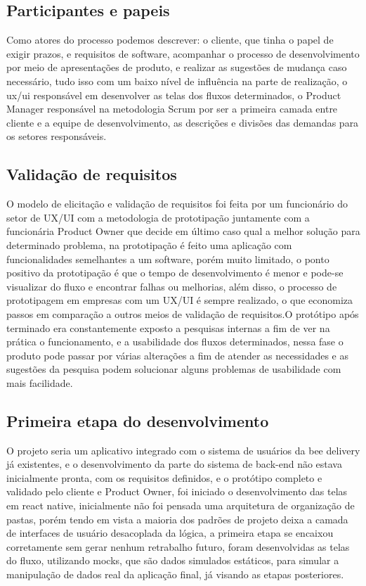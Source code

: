 \documentclass{ufersa}
\begin{document}
\subsection{Participantes e papeis}

Como atores do processo podemos descrever: o cliente, que tinha o papel de exigir prazos, e requisitos de software, acompanhar o processo de desenvolvimento por meio de apresentações de produto, e realizar as sugestões de mudança caso necessário, tudo isso com um baixo nível de influência na parte de realização, o ux/ui responsável em desenvolver as telas dos fluxos determinados, o Product Manager responsável na metodologia Scrum por ser a primeira camada entre cliente e a equipe de desenvolvimento, as descrições e divisões das demandas para os setores responsáveis.

\subsection{Validação de requisitos}

O modelo de elicitação e validação de requisitos foi feita por um funcionário do setor de UX/UI com a metodologia de prototipação juntamente com a funcionária Product Owner que decide em último caso qual a melhor solução para determinado problema, na prototipação é feito uma aplicação com funcionalidades semelhantes a um software, porém muito limitado, o ponto positivo da prototipação é que o tempo de desenvolvimento é menor e pode-se visualizar do fluxo e encontrar falhas ou melhorias, além disso, o processo de prototipagem em empresas com um UX/UI é sempre realizado, o que economiza passos em comparação a outros meios de validação de requisitos.O protótipo após terminado era constantemente exposto a pesquisas internas a fim de ver na prática o funcionamento, e a usabilidade dos fluxos determinados, nessa fase o produto pode passar por várias alterações a fim de atender as necessidades e as sugestões da pesquisa podem solucionar alguns problemas de usabilidade com mais facilidade. 

\subsection{Primeira etapa do desenvolvimento}

O projeto seria um aplicativo integrado com o sistema de usuários da bee delivery já existentes, e o 
desenvolvimento da parte do sistema de back-end não estava inicialmente pronta, com os requisitos definidos, e o protótipo completo e validado pelo cliente e Product Owner, foi iniciado o desenvolvimento das telas em react native, inicialmente não foi pensada uma arquitetura de organização de pastas, porém tendo em vista a maioria dos padrões de projeto deixa a camada de interfaces de usuário desacoplada da lógica, a primeira etapa se encaixou corretamente sem gerar nenhum retrabalho futuro, foram desenvolvidas as telas do fluxo, utilizando mocks, que são dados simulados estáticos, para simular a manipulação de dados real da aplicação final, já visando as etapas posteriores.
\end{document}

